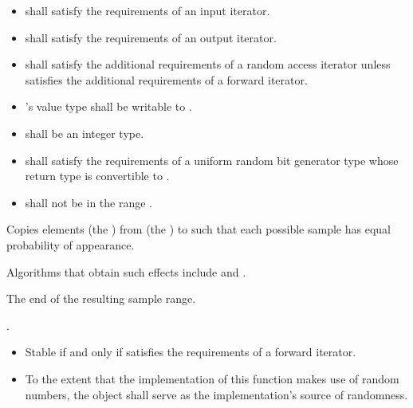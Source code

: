 \begin{itemdescr}
\pnum
\requires
\begin{itemize}
\item
{} shall satisfy the requirements of an input iterator.
\item
{} shall satisfy the requirements of an output iterator.
\item
{} shall satisfy the additional requirements of a random access iterator
unless  satisfies the additional requirements of a forward iterator.
\item
{}'s value type shall be writable to .
\item
{} shall be an integer type.
\item
{}
shall satisfy the requirements of a uniform random bit generator type
whose return type is convertible to .
\item
{} shall not be in the range .
\end{itemize}

\pnum
\effects
Copies  elements (the )
from  (the ) to 
such that each possible sample has equal probability of appearance.
\begin{note}
Algorithms that obtain such effects include 
and .
\end{note}

\pnum
\returns
The end of the resulting sample range.

\pnum
\complexity
{}.

\pnum
\remarks
\begin{itemize}
\item
Stable if and only if  satisfies the
requirements of a forward iterator.
\item
To the extent that the implementation of this function makes use of
random numbers, the object  shall serve as the
implementation's source of randomness.
\end{itemize}
\end{itemdescr}

